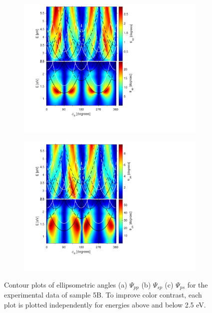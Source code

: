 \begin{figure}[h]
    \begin{subfigure}{0.49\textwidth}
        \centering
        \includegraphics[width=\linewidth, trim=1.2cm  1.8cm 6.5cm 0.3cm, clip]{figures/ch4/S5B/exp/S5B_Psi_sp_exp_55.pdf}
        \caption{}
    \end{subfigure}
    \begin{subfigure}{0.49\textwidth}
        \centering
        \includegraphics[width=\linewidth, trim=1.2cm  1.8cm 6.5cm 0.3cm, clip]{figures/ch4/S5B/exp/S5B_Psi_ps_exp_55.pdf}
        \caption{}
    \end{subfigure}
    \caption{Contour plots of ellipsometric angles (a) $\Psi_{pp}$ (b) $\Psi_{sp}$ (c) $\Psi_{ps}$ for the experimental data of sample 5B. To improve color contrast, each plot is plotted independently for energies above and below 2.5 eV.}
    \label{fig:S5B_contour_Rsp&Rps_Psisp&Psips_exp}
\end{figure}

